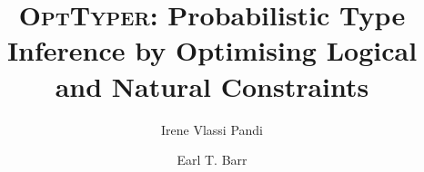 \documentclass[acmsmall, review, anonymous]{acmart}\settopmatter{printfolios=true,printccs=false,printacmref=false}
\begin{document}
\title{\textsc{OptTyper}: Probabilistic Type Inference by Optimising Logical and Natural Constraints}



\author{Irene Vlassi Pandi}

\author{Earl T. Barr}
\end{document}

